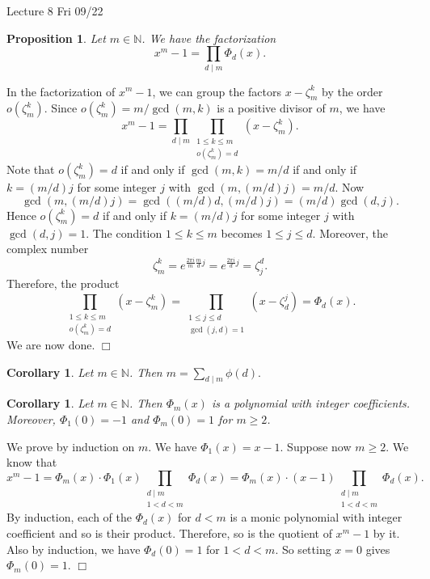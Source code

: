 \documentclass{article}
\def\N{{\mathbb N}}
\newtheorem{cor}[subsection]{Corollary}
\newtheorem{proposition}[subsection]{Proposition}
\newenvironment{proof}{\noindent {\bf Proof:}}{$\Box$ \vspace{2 ex}}
\newcommand{\add}[1]{{\color{blue} #1}}
\begin{document}
\begin{center}
    \add{Lecture 8 Fri 09/22}
\end{center}

\begin{proposition}
    Let $m\in\N$. We have the factorization $$x^m - 1 = \prod_{d\mid m}\Phi_d(x).$$
\end{proposition}

\begin{proof}
    In the factorization of $x^m - 1$, we can group the factors $x - \zeta_m^k$ by the order $o(\zeta_m^k)$. Since $o(\zeta_m^k) = m/\gcd(m,k)$ is a positive divisor of $m$, we have
    $$x^m - 1 = \prod_{d\mid m} \prod_{\substack{1\leq k\leq m\\ o(\zeta_m^k) = d}}(x - \zeta_m^k).$$
    Note that $o(\zeta_m^k) = d$ if and only if $\gcd(m,k) = m/d$ if and only if $k = (m/d)j$ for some integer $j$ with $\gcd(m,(m/d)j) = m/d.$ Now
    $$\gcd(m,(m/d)j) = \gcd((m/d)d,(m/d)j) = (m/d)\gcd(d,j).$$
    Hence $o(\zeta_m^k) = d$ if and only if $k = (m/d)j$ for some integer $j$ with $\gcd(d,j) = 1$. The condition $1\leq k\leq m$ becomes $1\leq j\leq d$. Moreover, the complex number $$\zeta_m^k = e^{\frac{2\pi i}{m}\frac{m}{d}j} = e^{\frac{2\pi i}{d}j} = \zeta_j^d.$$ Therefore, the product
    $$\prod_{\substack{1\leq k\leq m\\ o(\zeta_m^k) = d}}(x - \zeta_m^k) = \prod_{\substack{1\leq j\leq d\\ \gcd(j,d)=1}}(x - \zeta_d^j) = \Phi_d(x).$$
    We are now done.
\end{proof}

\begin{cor}\label{cor:sumphi}
    Let $m\in\N$. Then $\displaystyle m = \sum_{d\mid m}\phi(d).$
\end{cor}

\begin{cor}
    Let $m\in\N$. Then $\Phi_m(x)$ is a polynomial with integer coefficients. Moreover, $\Phi_1(0) = -1$ and $\Phi_m(0) = 1$ for $m\geq 2$.
\end{cor}

\begin{proof}
    We prove by induction on $m$. We have $\Phi_1(x) = x - 1$. Suppose now $m\geq 2$. We know that
    $$x^m - 1 = \Phi_m(x)\cdot\Phi_1(x)\prod_{\substack{d\mid m\\ 1 <d < m}}\Phi_d(x) = \Phi_m(x)\cdot(x - 1)\prod_{\substack{d\mid m\\ 1 <d < m}}\Phi_d(x).$$
    By induction, each of the $\Phi_d(x)$ for $d<m$ is a monic polynomial with integer coefficient and so is their product. Therefore, so is the quotient of $x^m - 1$ by it. Also by induction, we have $\Phi_d(0) = 1$ for $1<d<m$. So setting $x = 0$ gives $\Phi_m(0) = 1$.
\end{proof}
\end{document}
